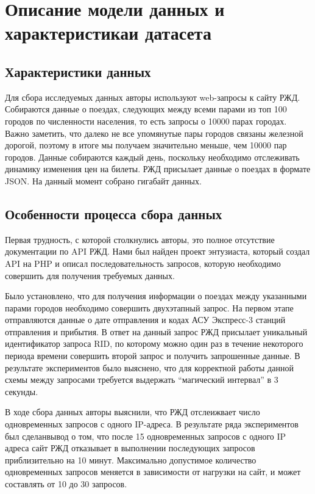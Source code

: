 \documentclass[conference]{IEEEtran}
\begin{document}
\section{Описание модели данных и характеристикаи датасета}
\subsection{Характеристики данных}

Для сбора исследуемых данных авторы используют web-запросы к сайту РЖД. Собираются данные о поездах, следующих между всеми парами из топ 100 городов по численности населения, то есть запросы о 10000 парах городах. Важно заметить, что далеко не все упомянутые пары городов связаны железной дорогой, поэтому в итоге мы получаем значительно меньше, чем 10000 пар городов. Данные собираются каждый день, поскольку необходимо отслеживать динамику изменения цен на билеты. РЖД присылает данные о поездах в формате JSON. На данный момент собрано %
гигабайт данных.

\subsection{Особенности процесса сбора данных}

Первая трудность, с которой столкнулись авторы, это полное отсутствие документации по API РЖД. Нами был найден проект энтузиаста, который создал API на PHP и описал последовательность запросов, которую необходимо совершить для получения требуемых данных. %

Было установлено, что для получения информации о поездах между указанными парами городов необходимо совершить двухэтапный запрос. На первом этапе отправляются данные о дате отправления и кодах АСУ Экспресс-3 станций отправления и прибытия. В ответ на данный запрос РЖД присылает уникальный идентификатор запроса RID, по которому можно один раз в течение некоторого периода времени совершить второй запрос и получить запрошенные данные. В результате экспериментов было выяснено, что для корректной работы данной схемы между запросами требуется выдержать ``магический интервал'' в 3 секунды.

В ходе сбора данных авторы выяснили, что РЖД отслеижвает число одновременных запросов с одного IP-адреса. В результате ряда экспериментов был сделанвывод о том, что после 15 одновременных запросов с одного IP адреса сайт РЖД отказывает в выполнении последующих запросов приблизительно на 10 минут. Максимально допустимое количество одновременных запросов меняется в зависимости от нагрузки на сайт, и может составлять от 10 до 30 запросов.
\end{document}
